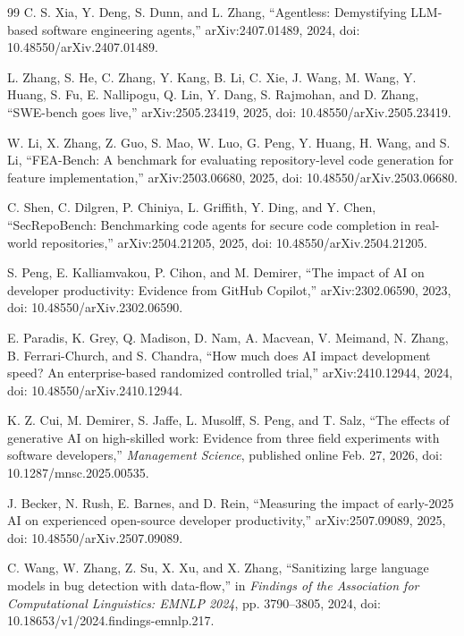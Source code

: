 \documentclass[preprint,12pt]{elsarticle}
\begin{document}
\begin{thebibliography}{99}
 C. S. Xia, Y. Deng, S. Dunn, and L. Zhang, ``Agentless: Demystifying LLM-based software engineering agents,'' arXiv:2407.01489, 2024, doi: 10.48550/arXiv.2407.01489.

 L. Zhang, S. He, C. Zhang, Y. Kang, B. Li, C. Xie, J. Wang, M. Wang, Y. Huang, S. Fu, E. Nallipogu, Q. Lin, Y. Dang, S. Rajmohan, and D. Zhang, ``SWE-bench goes live,'' arXiv:2505.23419, 2025, doi: 10.48550/arXiv.2505.23419.

 W. Li, X. Zhang, Z. Guo, S. Mao, W. Luo, G. Peng, Y. Huang, H. Wang, and S. Li, ``FEA-Bench: A benchmark for evaluating repository-level code generation for feature implementation,'' arXiv:2503.06680, 2025, doi: 10.48550/arXiv.2503.06680.

 C. Shen, C. Dilgren, P. Chiniya, L. Griffith, Y. Ding, and Y. Chen, ``SecRepoBench: Benchmarking code agents for secure code completion in real-world repositories,'' arXiv:2504.21205, 2025, doi: 10.48550/arXiv.2504.21205.

 S. Peng, E. Kalliamvakou, P. Cihon, and M. Demirer, ``The impact of AI on developer productivity: Evidence from GitHub Copilot,'' arXiv:2302.06590, 2023, doi: 10.48550/arXiv.2302.06590.

 E. Paradis, K. Grey, Q. Madison, D. Nam, A. Macvean, V. Meimand, N. Zhang, B. Ferrari-Church, and S. Chandra, ``How much does AI impact development speed? An enterprise-based randomized controlled trial,'' arXiv:2410.12944, 2024, doi: 10.48550/arXiv.2410.12944.

 K. Z. Cui, M. Demirer, S. Jaffe, L. Musolff, S. Peng, and T. Salz, ``The effects of generative AI on high-skilled work: Evidence from three field experiments with software developers,'' \textit{Management Science}, published online Feb. 27, 2026, doi: 10.1287/mnsc.2025.00535.

 J. Becker, N. Rush, E. Barnes, and D. Rein, ``Measuring the impact of early-2025 AI on experienced open-source developer productivity,'' arXiv:2507.09089, 2025, doi: 10.48550/arXiv.2507.09089.

 C. Wang, W. Zhang, Z. Su, X. Xu, and X. Zhang, ``Sanitizing large language models in bug detection with data-flow,'' in \textit{Findings of the Association for Computational Linguistics: EMNLP 2024}, pp. 3790--3805, 2024, doi: 10.18653/v1/2024.findings-emnlp.217.


\end{thebibliography}
\end{document}
